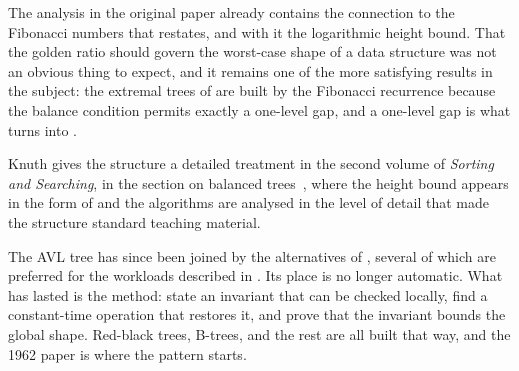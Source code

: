 The analysis in the original paper already contains the connection to the
Fibonacci numbers that  restates, and with it the
logarithmic height bound. That the golden ratio should govern the worst-case
shape of a data structure was not an obvious thing to expect, and it remains one
of the more satisfying results in the subject: the extremal trees of
 are built by the Fibonacci recurrence because the balance
condition permits exactly a one-level gap, and a one-level gap is what turns
 into .

Knuth gives the structure a detailed treatment in the second volume of
\emph{Sorting and Searching}, in the section on balanced trees~\cite{knuth3},
where the height bound appears in the form of  and the
algorithms are analysed in the level of detail that made the structure standard
teaching material.

The AVL tree has since been joined by the alternatives of
, several of which are preferred for the workloads
described in . Its place is no longer automatic. What has
lasted is the method: state an invariant that can be checked locally, find a
constant-time operation that restores it, and prove that the invariant bounds the
global shape. Red-black trees, B-trees, and the rest are all built that way, and
the 1962 paper is where the pattern starts.
